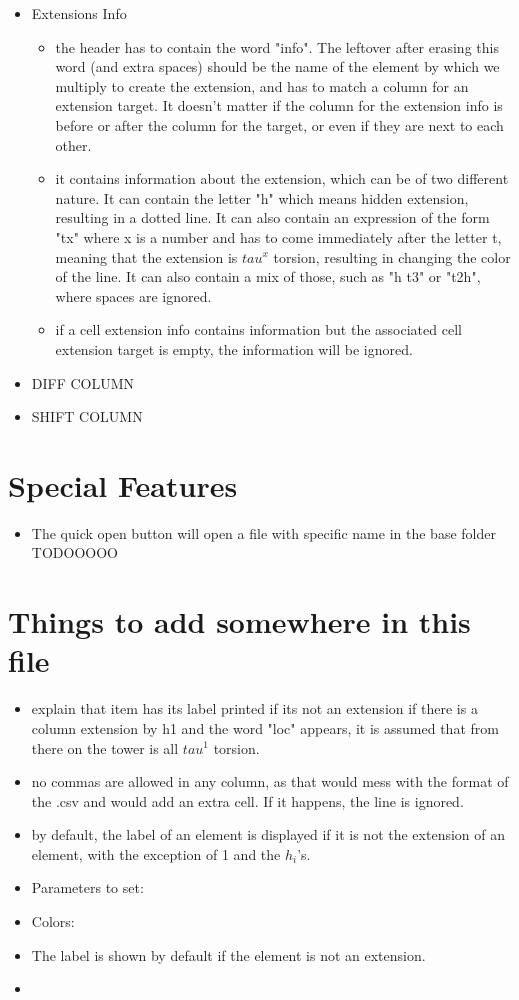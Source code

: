 \documentclass[a4paper,11pt]{article}
\begin{document}
\begin{itemize}
	
	\item{Extensions Info}
	\begin{itemize}
		\item the header has to contain the word "info". The leftover after erasing this word (and extra spaces) should be the name of the element by which we multiply to create the extension, and has to match a column for an extension target. It doesn't matter if the column for the extension info is before or after the column for the target, or even if they are next to each other.
		\item it contains information about the extension, which can be of two different nature. It can contain the letter "h" which means hidden extension, resulting in a dotted line. It can also contain an expression of the form "tx" where x is a number and has to come immediately after the letter t, meaning that the extension is $tau^x$ torsion, resulting in changing the color of the line. It can also contain a mix of those, such as "h t3" or "t2h", where spaces are ignored.
		\item if a cell extension info contains information but the associated cell extension target is empty, the information will be ignored.
	\end{itemize}
	\item{DIFF COLUMN}
	\item{SHIFT COLUMN}
\end{itemize}

\section{Special Features}
\begin{itemize}
\item The quick open button will open a file with specific name in the base folder TODOOOOO
\end{itemize}
	
\section{Things to add somewhere in this file}
\begin{itemize}
\item explain that item has its label printed if its not an extension
if there is a column extension by h1 and the word "loc" appears, it is assumed that from there on the tower is all $tau^1$ torsion. 
\item no commas are allowed in any column, as that would mess with the format of the .csv and would add an extra cell. If it happens, the line is ignored.
\item by default, the label of an element is displayed if it is not the extension of an element, with the exception of 1 and the $h_i$'s.
	
\item Parameters to set:

\item Colors:
\item The label is shown by default if the element is not an extension. 
\item 
\end{itemize}
\end{document}
